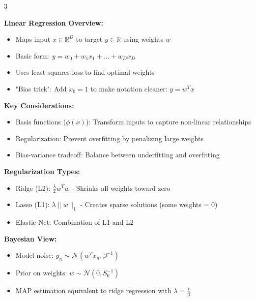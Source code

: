 \documentclass[10pt,landscape]{article}
\begin{document}
\scriptsize

\begin{multicols}{3}

\begin{tcolorbox}[breakable, title=1. Regression Concepts, colback=regression,boxsep=1pt,left=1pt,right=1pt,top=1pt,bottom=1pt]
\textbf{Linear Regression Overview:}
\begin{itemize}[leftmargin=*,noitemsep,topsep=0pt]
    \item Maps input $x \in \mathbb{R}^D$ to target $y \in \mathbb{R}$ using weights $w$
    \item Basic form: $y = w_0 + w_1x_1 + ... + w_Dx_D$
    \item Uses least squares loss to find optimal weights
    \item "Bias trick": Add $x_0=1$ to make notation cleaner: $y = w^T x$
\end{itemize}

\textbf{Key Considerations:}
\begin{itemize}[leftmargin=*,noitemsep,topsep=0pt]
    \item Basis functions ($\phi(x)$): Transform inputs to capture non-linear relationships
    \item Regularization: Prevent overfitting by penalizing large weights
    \item Bias-variance tradeoff: Balance between underfitting and overfitting
\end{itemize}

\textbf{Regularization Types:}
\begin{itemize}[leftmargin=*,noitemsep,topsep=0pt]
    \item Ridge (L2): $\frac{\lambda}{2}w^Tw$ - Shrinks all weights toward zero
    \item Lasso (L1): $\lambda\|w\|_1$ - Creates sparse solutions (some weights = 0)
    \item Elastic Net: Combination of L1 and L2
\end{itemize}

\textbf{Bayesian View:}
\begin{itemize}[leftmargin=*,noitemsep,topsep=0pt]
    \item Model noise: $y_n \sim \mathcal{N}(w^Tx_n, \beta^{-1})$
    \item Prior on weights: $w \sim \mathcal{N}(0, S_0^{-1})$
    \item MAP estimation equivalent to ridge regression with $\lambda = \frac{s}{\beta}$
\end{itemize}
\end{tcolorbox}


\end{multicols}
\end{document}
